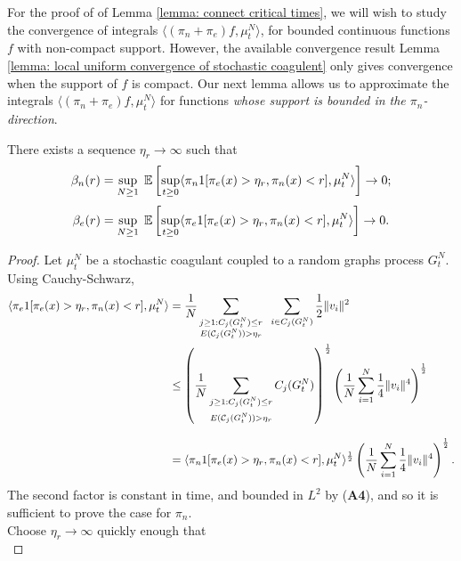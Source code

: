 For the proof of of Lemma \ref{lemma: connect critical times}, we will wish to study the convergence of integrals $\langle (\pi_n+\pi_e)f, \mu^N_t\rangle$, for bounded continuous functions $f$ with non-compact support. However, the available convergence result Lemma \ref{lemma: local uniform convergence of stochastic coagulent} only gives convergence when the support of $f$ is compact. Our next lemma allows us to approximate the integrals $\langle (\pi_n+\pi_e)f, \mu^N_t\rangle$ for functions \emph{whose support is bounded in the $\pi_n$-direction}. \begin{lemma}\label{lemma: etar} There exists a sequence $\eta_r \rightarrow \infty$ such that \begin{equation}
    \beta_n(r)=\sup_{N\geq 1} \hspace{0.1cm} \mathbb{E}\left[\sup_{t\geq 0}\langle \pi_n 1[\pi_e(x)>\eta_r, \pi_n(x)< r], \mu^N_t\rangle \right]\rightarrow 0;
\end{equation} \begin{equation}
    \beta_e(r)= \sup_{N\geq 1} \hspace{0.1cm} \mathbb{E}\left[\sup_{t\geq 0}\langle \pi_e 1[\pi_e(x)>\eta_r, \pi_n(x)< r], \mu^N_t\rangle\right] \rightarrow 0. 
\end{equation} \end{lemma} \begin{proof} Let $\mu^N_t$ be a stochastic coagulant coupled to a random graphs process $G^N_t$. Using Cauchy-Schwarz, \begin{equation} \begin{split}
   \langle \pi_e 1[\pi_e(x)>\eta_r, \pi_n(x)< r], \mu^N_t\rangle & = \frac{1}{N} \sum_{\substack{j\geq 1: C_j(G^N_t)\le r \\ E(\mathcal{C}_j(G^N_t))>\eta_r}} \hspace{0.2cm} \sum_{i\in C_j(G^N_t)} \frac{1}{2}\|v_i\|^2  \\ & \leq \left(\frac{1}{N} \sum_{\substack{j\geq 1: C_j(G^N_t)\le r \\[1ex] E(\mathcal{C}_j(G^N_t))>\eta_r}} C_j(G^N_t)\right)^\frac{1}{2}\left(\frac{1}{N}\sum_{i=1}^N \frac{1}{4}\|v_i\|^4\right)^\frac{1}{2}  \\[2ex] & = \langle \pi_n 1[\pi_e(x)>\eta_r, \pi_n(x)< r], \mu^N_t\rangle^\frac{1}{2}\left(\frac{1}{N}\sum_{i=1}^N \frac{1}{4}\|v_i\|^4\right)^\frac{1}{2}.
\end{split} \end{equation} The second factor is constant in time, and bounded in $L^2$ by (\textbf{A4}), and so it is sufficient to prove the case for $\pi_n$. \medskip \\ Choose $\eta_r\rightarrow \infty$ quickly enough that \begin{equation} \label{eq: choice of etar}

\end{equation}
\end{proof}
